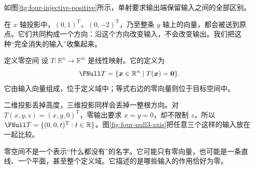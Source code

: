 \documentclass[a4paper,12pt,twoside,openany,fontset=none]{ctexbook}
\newcounter{definition}[chapter]
\newenvironment{definition}[1][]{\begin{defBox}{定义}{#1}}{\end{defBox}}
\numberwithin{equation}{chapter}
\begin{document}
如图\ref{fig:four-injective-positive}所示，单射要求输出端保留输入之间的全部区别。


在 $x$ 轴投影中，$(0,1)^{\mathrm T}$、$(0,-2)^{\mathrm T}$，乃至整条 $y$ 轴上的向量，都会被送到原点。它们共同构成一个方向：沿这个方向改变输入，不会改变输出。我们把这种“完全消失的输入”收集起来。

\begin{definition}[零空间]
设 $T:\mathbb R^n\to\mathbb R^m$ 是线性映射。它的定义为
\[
 \FNull T=\{\boldsymbol x\in\mathbb R^n\mid T(\boldsymbol x)=\boldsymbol0\}.
\]
它由输入向量组成，位于定义域中；等式右边的零向量则位于目标空间中。
\end{definition}

二维投影丢掉高度，三维投影同样会丢掉一整根方向。对 $T(x,y,z)=(x,y,0)^{\mathrm T}$，零输出要求 $x=y=0$，却不限制 $z$，所以 $\FNull T=\{(0,0,t)^{\mathrm T}:t\in\mathbb R\}$。图\ref{fig:four-null3-axis}把任意三个这样的输入放在一起比较。

零空间不是一个表示“什么都没有”的名字。它可能只有零向量，也可能是一条直线、一个平面，甚至整个定义域。它描述的是哪些输入的作用恰好为零。
\end{document}
